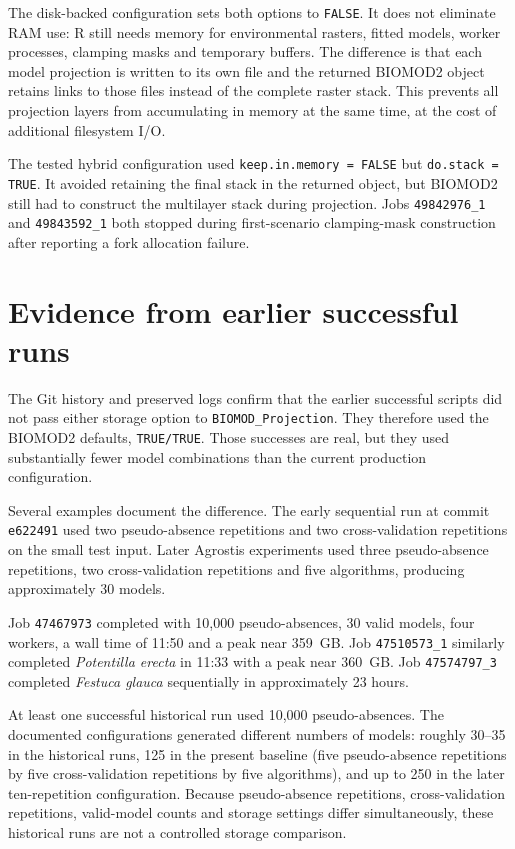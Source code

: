 The disk-backed configuration sets both options to \texttt{FALSE}. It does not eliminate RAM use: R still needs memory for environmental rasters, fitted models, worker processes, clamping masks and temporary buffers. The difference is that each model projection is written to its own file and the returned BIOMOD2 object retains links to those files instead of the complete raster stack. This prevents all projection layers from accumulating in memory at the same time, at the cost of additional filesystem I/O.

The tested hybrid configuration used \texttt{keep.in.memory = FALSE} but \texttt{do.stack = TRUE}. It avoided retaining the final stack in the returned object, but BIOMOD2 still had to construct the multilayer stack during projection. Jobs \texttt{49842976\_1} and \texttt{49843592\_1} both stopped during first-scenario clamping-mask construction after reporting a fork allocation failure.

\section{Evidence from earlier successful runs}

The Git history and preserved logs confirm that the earlier successful scripts did not pass either storage option to \texttt{BIOMOD\_Projection}. They therefore used the BIOMOD2 defaults, \texttt{TRUE/TRUE}. Those successes are real, but they used substantially fewer model combinations than the current production configuration.

Several examples document the difference. The early sequential run at commit \texttt{e622491} used two pseudo-absence repetitions and two cross-validation repetitions on the small test input. Later Agrostis experiments used three pseudo-absence repetitions, two cross-validation repetitions and five algorithms, producing approximately 30 models.

Job \texttt{47467973} completed with 10,000 pseudo-absences, 30 valid models, four workers, a wall time of 11:50 and a peak near 359~GB. Job \texttt{47510573\_1} similarly completed \emph{Potentilla erecta} in 11:33 with a peak near 360~GB. Job \texttt{47574797\_3} completed \emph{Festuca glauca} sequentially in approximately 23 hours.

At least one successful historical run used 10,000 pseudo-absences. The documented configurations generated different numbers of models: roughly 30--35 in the historical runs, 125 in the present baseline (five pseudo-absence repetitions by five cross-validation repetitions by five algorithms), and up to 250 in the later ten-repetition configuration. Because pseudo-absence repetitions, cross-validation repetitions, valid-model counts and storage settings differ simultaneously, these historical runs are not a controlled storage comparison.

